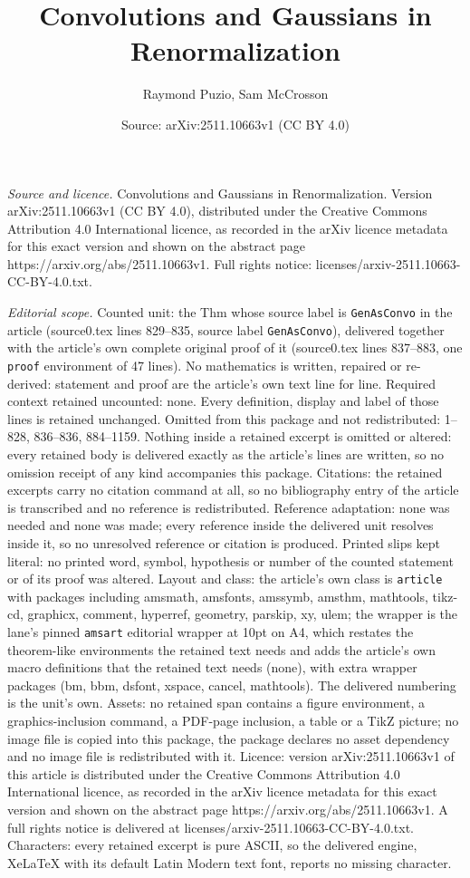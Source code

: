 \documentclass[10pt,a4paper]{amsart}
\title[Convolutions and Gaussians in Renormalization]{Convolutions and Gaussians in Renormalization}
\author{Raymond Puzio, Sam McCrosson}
\date{Source: arXiv:2511.10663v1 (CC BY 4.0)}
\begin{document}
\maketitle

\noindent\emph{Source and licence.} Convolutions and Gaussians in Renormalization. Version arXiv:2511.10663v1 (CC BY 4.0), distributed under the Creative Commons Attribution 4.0 International licence, as recorded in the arXiv licence metadata for this exact version and shown on the abstract page https://arxiv.org/abs/2511.10663v1. Full rights notice: licenses/arxiv-2511.10663-CC-BY-4.0.txt.\par\smallskip

\noindent\textit{Editorial scope.} Counted unit: the Thm whose source label is \texttt{GenAsConvo} in the article (source0.tex lines 829--835, source label \texttt{GenAsConvo}), delivered together with the article's own complete original proof of it (source0.tex lines 837--883, one \texttt{proof} environment of 47 lines). No mathematics is written, repaired or re-derived: statement and proof are the article's own text line for line. Required context retained uncounted: none. Every definition, display and label of those lines is retained unchanged. Omitted from this package and not redistributed: 1--828, 836--836, 884--1159. Nothing inside a retained excerpt is omitted or altered: every retained body is delivered exactly as the article's lines are written, so no omission receipt of any kind accompanies this package. Citations: the retained excerpts carry no citation command at all, so no bibliography entry of the article is transcribed and no reference is redistributed. Reference adaptation: none was needed and none was made; every reference inside the delivered unit resolves inside it, so no unresolved reference or citation is produced. Printed slips kept literal: no printed word, symbol, hypothesis or number of the counted statement or of its proof was altered. Layout and class: the article's own class is \texttt{article} with packages including amsmath, amsfonts, amssymb, amsthm, mathtools, tikz-cd, graphicx, comment, hyperref, geometry, parskip, xy, ulem; the wrapper is the lane's pinned \texttt{amsart} editorial wrapper at 10pt on A4, which restates the theorem-like environments the retained text needs and adds the article's own macro definitions that the retained text needs (none), with extra wrapper packages (bm, bbm, dsfont, xspace, cancel, mathtools). The delivered numbering is the unit's own. Assets: no retained span contains a figure environment, a graphics-inclusion command, a PDF-page inclusion, a table or a TikZ picture; no image file is copied into this package, the package declares no asset dependency and no image file is redistributed with it. Licence: version arXiv:2511.10663v1 of this article is distributed under the Creative Commons Attribution 4.0 International licence, as recorded in the arXiv licence metadata for this exact version and shown on the abstract page https://arxiv.org/abs/2511.10663v1. A full rights notice is delivered at licenses/arxiv-2511.10663-CC-BY-4.0.txt. Characters: every retained excerpt is pure ASCII, so the delivered engine, XeLaTeX with its default Latin Modern text font, reports no missing character.
\end{document}

